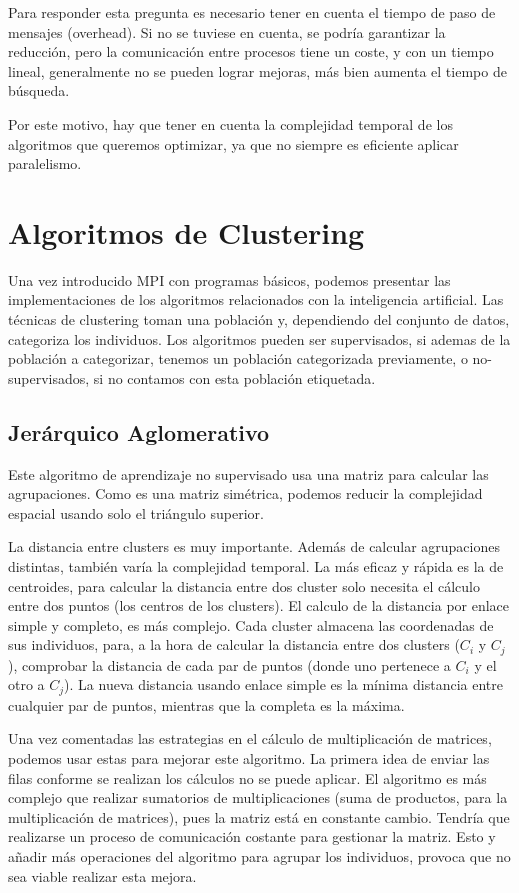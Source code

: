 	Para responder esta pregunta es necesario tener en cuenta el tiempo de paso de mensajes (overhead). Si no se tuviese en cuenta, se podría garantizar la reducción, pero la comunicación entre procesos tiene un coste, y con un tiempo lineal, generalmente no se pueden lograr mejoras, más bien aumenta el tiempo de búsqueda. 
	
	Por este motivo, hay que tener en cuenta la complejidad temporal de los algoritmos que queremos optimizar, ya que no siempre es eficiente aplicar paralelismo.


\section{Algoritmos de Clustering}

	Una vez introducido MPI con programas básicos, podemos presentar las implementaciones de los algoritmos relacionados con la inteligencia artificial. Las técnicas de clustering toman una población y, dependiendo del conjunto de datos, categoriza los individuos. Los algoritmos pueden ser supervisados, si ademas de la población a categorizar, tenemos un población categorizada previamente, o no-supervisados, si no contamos con esta población etiquetada.

	\subsection{Jerárquico Aglomerativo}
	\label{cap:3_2_1}
		Este algoritmo de aprendizaje no supervisado usa una matriz para calcular las agrupaciones. Como es una matriz simétrica, podemos reducir la complejidad espacial usando solo el triángulo superior. 
		
		La distancia entre clusters es muy importante. Además de calcular agrupaciones distintas, también varía la complejidad temporal. La más eficaz y rápida es la de centroides, para calcular la distancia entre dos cluster solo necesita el cálculo entre dos puntos (los centros de los clusters). El calculo de la distancia por enlace simple y completo, es más complejo. Cada cluster almacena las coordenadas de sus individuos, para, a la hora de calcular la distancia entre dos clusters (\(C_{i}\) y \(C_{j}\)), comprobar la distancia de cada par de puntos (donde uno pertenece a \(C_{i}\) y el otro a \(C_{j}\)). La nueva distancia usando enlace simple es la mínima distancia entre cualquier par de puntos, mientras que la completa es la máxima.
		
	
		Una vez comentadas las estrategias en el cálculo de multiplicación de matrices, podemos usar estas para mejorar este algoritmo. La primera idea de enviar las filas conforme se realizan los cálculos no se puede aplicar. El algoritmo es más complejo que realizar sumatorios de multiplicaciones (suma de productos, para la multiplicación de matrices), pues la matriz está en constante cambio. Tendría que realizarse un proceso de comunicación costante para gestionar la matriz. Esto y añadir más operaciones del algoritmo para agrupar los individuos, provoca que no sea viable realizar esta mejora. 
		
